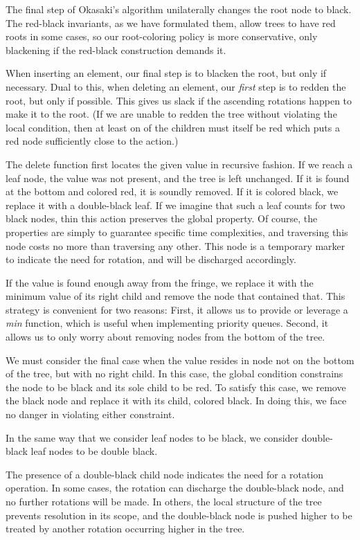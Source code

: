 \documentclass[preprint]{sigplanconf}
\begin{document}
The final step of Okasaki's algorithm unilaterally changes the root node to black. The red-black invariants, as we have formulated them, allow trees to have red roots in some cases, so our root-coloring policy is more conservative, only blackening if the red-black construction demands it.

When inserting an element, our final step is to blacken the root, but only if necessary. Dual to this, when deleting an element, our \emph{first} step is to redden the root, but only if possible. This gives us slack if the ascending rotations happen to make it to the root. (If we are unable to redden the tree without violating the local condition, then at least on of the children must itself be red which puts a red node sufficiently close to the action.)

The delete function first locates the given value in recursive fashion. If we reach a leaf node, the value was not present, and the tree is left unchanged. If it is found at the bottom and colored red, it is soundly removed. If it is colored black, we replace it with a double-black leaf. If we imagine that such a leaf counts for two black nodes, thin this action preserves the global property. Of course, the properties are simply to guarantee specific time complexities, and traversing this node costs no more than traversing any other. This node is a temporary marker to indicate the need for rotation, and will be discharged accordingly.

If the value is found enough away from the fringe, we replace it with the minimum value of its right child and remove the node that contained that. This strategy is convenient for two reasons: First, it allows us to provide or leverage a \emph{min} function, which is useful when implementing priority queues. Second, it allows us to only worry about removing nodes from the bottom of the tree.

We must consider the final case when the value resides in node not on the bottom of the tree, but with no right child. In this case, the global condition constrains the node to be black and its sole child to be red. To satisfy this case, we remove the black node and replace it with its child, colored black. In doing this, we face no danger in violating either constraint.

In the same way that we consider leaf nodes to be black, we consider double-black leaf nodes to be double black.

The presence of a double-black child node indicates the need for a rotation operation. In some cases, the rotation can discharge the double-black node, and no further rotations will be made. In others, the local structure of the tree prevents resolution in its scope, and the double-black node is pushed higher to be treated by another rotation occurring higher in the tree.
\end{document}
